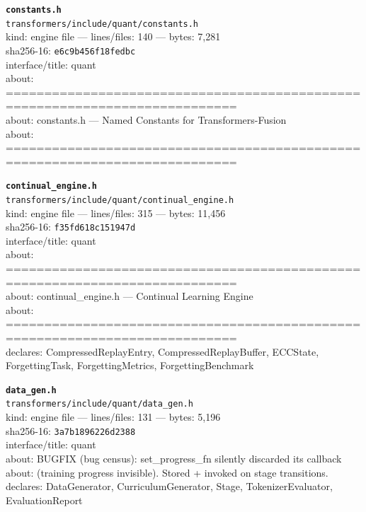 \noindent\textbf{\texttt{constants.h}}\\
\texttt{transformers/include/quant/constants.h}\\
kind: engine file --- lines/files: 140 --- bytes: 7,281\\
sha256-16: \texttt{e6c9b456f18fedbc}\\
interface/title: quant\\
about: ============================================================================\\
about: constants.h — Named Constants for Transformers-Fusion\\
about: ============================================================================\\
\vspace*{6.0pt}
\newpage

\noindent\textbf{\texttt{continual\_engine.h}}\\
\texttt{transformers/include/quant/continual\_engine.h}\\
kind: engine file --- lines/files: 315 --- bytes: 11,456\\
sha256-16: \texttt{f35fd618c151947d}\\
interface/title: quant\\
about: ============================================================================\\
about: continual\_engine.h — Continual Learning Engine\\
about: ============================================================================\\
declares: CompressedReplayEntry, CompressedReplayBuffer, ECCState, ForgettingTask, ForgettingMetrics, ForgettingBenchmark\\
\vspace*{6.0pt}

\noindent\textbf{\texttt{data\_gen.h}}\\
\texttt{transformers/include/quant/data\_gen.h}\\
kind: engine file --- lines/files: 131 --- bytes: 5,196\\
sha256-16: \texttt{3a7b1896226d2388}\\
interface/title: quant\\
about: BUGFIX (bug census): set\_progress\_fn silently discarded its callback\\
about: (training progress invisible). Stored + invoked on stage transitions.\\
declares: DataGenerator, CurriculumGenerator, Stage, TokenizerEvaluator, EvaluationReport\\
\vspace*{6.0pt}

